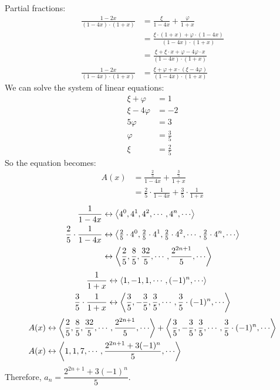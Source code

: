 \documentclass[12pt]{article}
\begin{document}
\noindent
Partial fractions:
\begin{align*}
\frac{1 - 2x}{(1-4x) \cdot (1+x)} &= \frac{\xi}{1-4x} + \frac{\varphi}{1+x} \\
&= \frac{\xi \cdot (1+x) + \varphi \cdot (1-4x)}{(1-4x) \cdot (1+x)} \\
&= \frac{\xi + \xi \cdot x + \varphi - 4 \varphi \cdot x}{(1-4x) \cdot (1+x)} \\
\frac{1 - 2x}{(1-4x) \cdot (1+x)} &= \frac{\xi + \varphi + x \cdot (\xi  - 4 \varphi)}{(1-4x) \cdot (1+x)}
\end{align*}
We can solve the system of linear equations:
\begin{align*}
\xi + \varphi &= 1 \\
\xi -4 \varphi &= -2 \\
5 \varphi &= 3 \\
\varphi &= \tfrac{3}{5} \\
\xi &= \tfrac{2}{5}
\end{align*}
So the equation becomes:
\begin{align*}
A(x) &= \frac{\tfrac{2}{5}}{1-4x} + \frac{\tfrac{3}{5}}{1+x} \\
&= \frac{2}{5} \cdot \frac{1}{1-4x} + \frac{3}{5} \cdot \frac{1}{1+x}
\end{align*}
\begin{align*}
\frac{1}{1-4x} &\leftrightarrow \Braket{4^0, 4^1, 4^2, \cdots, 4^n, \cdots} \\
\frac{2}{5} \cdot \frac{1}{1-4x} &\leftrightarrow \Braket{\tfrac{2}{5} \cdot 4^0, \tfrac{2}{5} \cdot 4^1, \tfrac{2}{5} \cdot 4^2, \cdots, \tfrac{2}{5} \cdot 4^n, \cdots} \\
&\leftrightarrow \Braket{\frac{2}{5}, \frac{8}{5}, \frac{32}{5}, \cdots, \frac{2^{2n+1}}{5}, \cdots}
\end{align*}
\begin{align*}
\frac{1}{1+x} &\leftrightarrow \Braket{1, -1, 1, \cdots, (-1)^n, \cdots} \\
\frac{3}{5} \cdot \frac{1}{1+x} &\leftrightarrow \Braket{\frac{3}{5}, -\frac{3}{5}, \frac{3}{5}, \cdots, \frac{3}{5} \cdot (-1)^n, \cdots}
\end{align*}
\begin{align*}
A(x) &\leftrightarrow \Braket{\frac{2}{5}, \frac{8}{5}, \frac{32}{5}, \cdots, \frac{2^{2n+1}}{5}, \cdots} + \Braket{\frac{3}{5}, -\frac{3}{5}, \frac{3}{5}, \cdots, \frac{3}{5} \cdot (-1)^n, \cdots} \\
A(x) &\leftrightarrow \Braket{1, 1, 7, \cdots, \frac{2^{2n+1} + 3(-1)^n}{5}, \cdots}
\end{align*}
Therefore, $a_n = \dfrac{2^{2n+1} + 3(-1)^n}{5}$.
\end{document}
